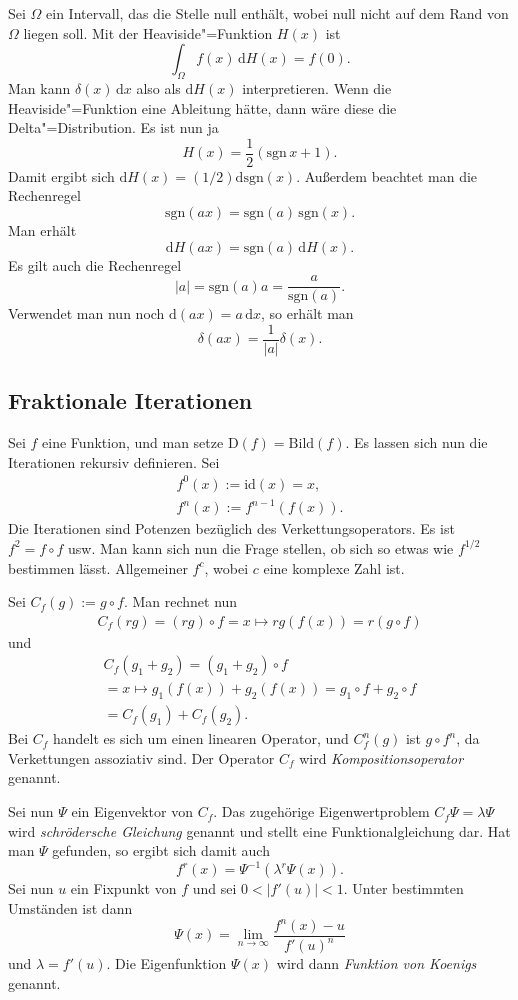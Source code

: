 \documentclass[a4paper,10pt,fleqn,twocolumn,twoside]{article}
\begin{document}
Sei $\Omega$ ein Intervall, das die Stelle null enthält, wobei
null nicht auf dem Rand von $\Omega$ liegen soll. Mit der
Heaviside"=Funktion $H(x)$ ist
\[\int_{\Omega} f(x)\,\mathrm dH(x) = f(0).\]
Man kann $\delta(x)\,\mathrm dx$ also als $\mathrm dH(x)$
interpretieren. Wenn die Heaviside"=Funktion eine Ableitung hätte,
dann wäre diese die Delta"=Distribution. Es ist nun ja
\[H(x) = \frac{1}{2}(\mathrm{sgn}\,x+1).\]
Damit ergibt sich $\mathrm dH(x) = (1/2)\mathrm d\mathrm{sgn}(x)$.
Außerdem beachtet man die Rechenregel
\[\mathrm{sgn}(ax) = \mathrm{sgn}(a)\,\mathrm{sgn}(x).\]
Man erhält
\[\mathrm dH(ax) = \mathrm{sgn}(a)\,\mathrm dH(x).\]
Es gilt auch die Rechenregel
\[|a| = \mathrm{sgn}(a)a = \frac{a}{\mathrm{sgn}(a)}.\]
Verwendet man nun noch $\mathrm d(ax) = a\,\mathrm dx$,
so erhält man
\[\delta(ax) = \frac{1}{|a|}\delta(x).\]

\subsection{Fraktionale Iterationen}

Sei $f$ eine Funktion, und man setze
$\mathrm{D}(f)=\mathrm{Bild}(f)$. Es lassen sich nun die
Iterationen rekursiv definieren. Sei
\begin{gather*}
f^0(x) := \mathrm{id}(x) = x,\\
f^n(x) := f^{n-1}(f(x)).
\end{gather*}
Die Iterationen sind Potenzen bezüglich des Verkettungsoperators.
Es ist $f^2=f\circ f$ usw. Man kann sich nun die Frage stellen,
ob sich so etwas wie $f^{1/2}$ bestimmen lässt. Allgemeiner $f^c$,
wobei $c$ eine komplexe Zahl ist.

Sei $C_f(g) := g\circ f$. Man rechnet nun
\begin{gather*}
C_f(rg) = (rg)\circ f = x\mapsto rg(f(x)) = r(g\circ f)
\end{gather*}
und
\begin{gather*}
C_f(g_1+g_2) = (g_1+g_2)\circ f\\
= x\mapsto g_1(f(x))+g_2(f(x))
= g_1\circ f+g_2\circ f
\\= C_f(g_1)+C_f(g_2).
\end{gather*}
Bei $C_f$ handelt es sich um einen linearen Operator, und
$C_f^n(g)$ ist $g\circ f^n$, da Verkettungen assoziativ sind.
Der Operator $C_f$ wird \textit{Kompositionsoperator} genannt.

Sei nun $\Psi$ ein Eigenvektor von $C_f$. Das zugehörige
Eigenwertproblem $C_f\Psi = \lambda\Psi$ wird
\textit{schrödersche Gleichung}
genannt und stellt eine Funktionalgleichung dar. Hat man $\Psi$
gefunden, so ergibt sich damit auch
\[f^r(x) = \Psi^{-1}(\lambda^r\Psi(x)).\]
Sei nun $u$ ein Fixpunkt von $f$ und sei $0<|f'(u)|<1$.
Unter bestimmten Umständen ist dann
\[\Psi(x) = \lim_{n\rightarrow\infty}\frac{f^n(x)-u}{f'(u)^n}\]
und $\lambda=f'(u)$. Die Eigenfunktion $\Psi(x)$ wird
dann \textit{Funktion von Koenigs} genannt.
\end{document}
